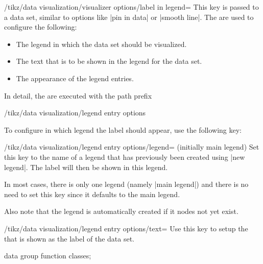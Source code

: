 \begin{key}{/tikz/data visualization/visualizer options/label in legend=}
    This key is passed to a data set, similar to options like |pin in data| or
    |smooth line|. The  are used to configure the following:
    \begin{itemize}
        \item The legend in which the data set should be visualized.
        \item The text that is to be shown in the legend for the data set.
        \item The appearance of the legend entries.
    \end{itemize}
    In detail, the  are executed with the path prefix
\begin{codeexample}
/tikz/data visualization/legend entry options
\end{codeexample}
    To configure in which legend the label should appear, use the
    following key:
    \begin{key}{/tikz/data visualization/legend entry options/legend= (initially main legend)}
        Set this key to the name of a legend that has previously been created
        using |new legend|. The label will then be shown in this legend.

        In most cases, there is only one legend (namely |main legend|) and
        there is no need to set this key since it defaults to the main legend.

        Also note that the legend  is automatically created if it
        nodes not yet exist.
    \end{key}

    \begin{key}{/tikz/data visualization/legend entry options/text=}
        Use this key to setup the  that is shown as the label of the
        data set.
\begin{codeexample}[
    width=8cm,
    preamble={\usetikzlibrary{datavisualization.formats.functions}},
    pre={\tikz \datavisualization data group {function classes} = {
  data [set=log, format=function] {
    var x : interval [0.2:2.5];
    func y = ln(\value x);
  }
  data [set=lin, format=function] {
    var x : interval [-2:2.5];
    func y = 0.5*\value x;
  }
  data [set=squared, format=function] {
    var x : interval [-1.5:1.5];
    func y = \value x*\value x;
  }
  data [set=exp, format=function] {
    var x : interval [-2.5:1];
    func y = exp(\value x);
  }
};},
]
\tikz \datavisualization [
  scientific axes, x axis={label=$x$},
  visualize as smooth line/.list=
  {log, lin, squared, exp},
  log=    {label in legend={text=$\log x$}},
  lin=    {label in legend={text=$x/2$}},
  squared={pin in data    ={text=$x^2$, pos=0.1}},
  exp=    {label in data  ={text=$e^x$}},
  style sheet=vary dashing]
data group {function classes};
\end{codeexample}
    \end{key}


\end{key}
